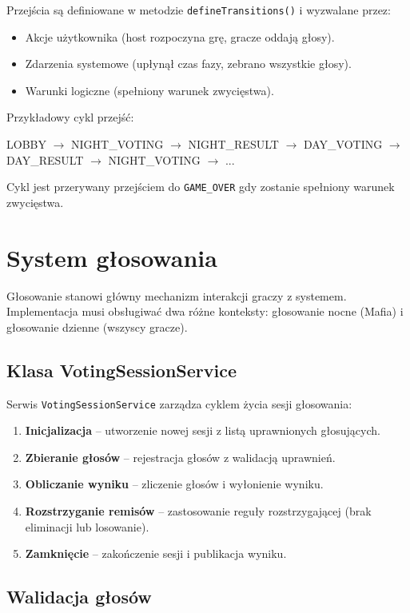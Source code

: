 ﻿\documentclass[a4paper,twoside,11pt]{mwrep}
\theoremstyle{plain} \newtheorem{thm}{Twierdzenie}
\theoremstyle{plain} \newtheorem{lem}{Lemat}
\theoremstyle{definition} \newtheorem{defn}{Definicja}
\theoremstyle{remark} \newtheorem*{rem}{Wniosek}
\begin{document}
Przejścia są definiowane w metodzie \texttt{defineTransitions()} i wyzwalane przez:
\begin{itemize}
    \item Akcje użytkownika (host rozpoczyna grę, gracze oddają głosy).
    \item Zdarzenia systemowe (upłynął czas fazy, zebrano wszystkie głosy).
    \item Warunki logiczne (spełniony warunek zwycięstwa).
\end{itemize}

Przykładowy cykl przejść:
\begin{center}
LOBBY $\rightarrow$ NIGHT\_VOTING $\rightarrow$ NIGHT\_RESULT $\rightarrow$ DAY\_VOTING $\rightarrow$ DAY\_RESULT $\rightarrow$ NIGHT\_VOTING $\rightarrow$ ...
\end{center}

Cykl jest przerywany przejściem do \texttt{GAME\_OVER} gdy zostanie spełniony warunek zwycięstwa.

\section{System głosowania}

Głosowanie stanowi główny mechanizm interakcji graczy z systemem. Implementacja musi obsługiwać dwa różne konteksty: głosowanie nocne (Mafia) i głosowanie dzienne (wszyscy gracze).

\subsection{Klasa VotingSessionService}

Serwis \texttt{VotingSessionService} zarządza cyklem życia sesji głosowania:
\begin{enumerate}
    \item \textbf{Inicjalizacja} -- utworzenie nowej sesji z listą uprawnionych głosujących.
    \item \textbf{Zbieranie głosów} -- rejestracja głosów z walidacją uprawnień.
    \item \textbf{Obliczanie wyniku} -- zliczenie głosów i wyłonienie wyniku.
    \item \textbf{Rozstrzyganie remisów} -- zastosowanie reguły rozstrzygającej (brak eliminacji lub losowanie).
    \item \textbf{Zamknięcie} -- zakończenie sesji i publikacja wyniku.
\end{enumerate}

\subsection{Walidacja głosów}
\end{document}
